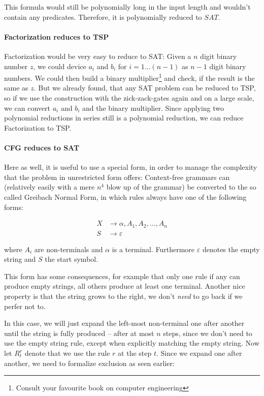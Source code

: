This formula would still be polynomially long in the input length and 
wouldn't contain any predicates. Therefore, it is polynomially reduced 
to $SAT$.
\DONE
\paragraph{Factorization reduces to TSP}
Factorization would be very easy to reduce to SAT: Given a $n$ digit binary 
number $z$, we could device $a_i$ and $b_i$ for $i=1\ldots (n-1)$ as $n-1$ digit 
binary numbers. We could then build a binary multiplier\footnote{Consult your 
favourite book on computer engineering} and check, if the result is the same 
as $z$. But we already found, that any SAT problem can be reduced to TSP, so 
if we use the construction with the zick-zack-gates again and on a large 
scale, we can convert $a_i$ and $b_i$ and the binary multiplier. Since 
applying two polynomial reductions in series still is a polynomial reduction, 
we can reduce Factorization to TSP. 

\paragraph{CFG reduces to SAT}
Here as well, it is useful to use a special form, in order to manage the 
complexity that the problem in unrestricted form offers: Context-free 
grammars can (relatively easily with a mere $n^4$ blow up of the grammar) be
converted to the so called Greibach Normal Form, in which rules always have one
of the following forms:

\begin{align*}
	X &\rightarrow \alpha, A_1, A_2, \ldots, A_n \\
	S &\rightarrow \varepsilon
\end{align*}

where $A_i$ are non-terminals and $\alpha$ is a terminal. Furthermore $\varepsilon$ 
denotes the empty string and $S$ the start symbol.

This form has some consequences, for example that only one rule if any can 
produce empty strings, all others produce at least one terminal. Another nice 
property is that the string grows to the right, we don't \emph{need} to go 
back if we perfer not to.

In this case, we will just expand the left-most non-terminal one after 
another until the string is fully produced -- after at most $n$ steps, since 
we don't need to use the empty string rule, except when explicitly matching 
the empty string. Now let $R_t^r$ denote that we use the rule $r$ at the step $t$.
Since we expand one after another, we need to formalize exclusion as seen earlier:

